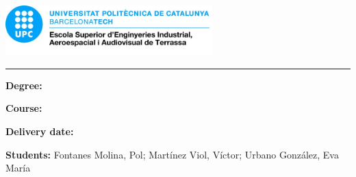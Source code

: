 
\thispagestyle{CoverPage}


\begin{center}\bf

\vspace{50pt}


\vspace{6pt}

\includegraphics[width=0.6\textwidth]{./doc_config/images/UPC_ESEIAAT.jpg}

\vspace{200pt}

{\fontsize{24pt}{20pt}\selectfont \ProjectName}

\vspace{10pt}

{\fontsize{20pt}{20pt}\selectfont \Acronym}


\textcolor{UPC_blue}{\rule{\textwidth}{.6pt}}

{\Large \DocType}

\end{center}

\vspace{50pt}

\textbf{Degree:} \Degree

\textbf{Course:} \Course

\textbf{Delivery date:} \DocDate\\

\vspace{10pt}

\textbf{Students:} Fontanes Molina, Pol; Martínez Viol, Víctor; Urbano González, Eva María


